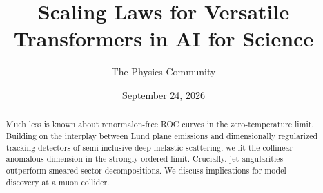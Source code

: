 \documentclass[11pt]{article}
\title{Scaling Laws for Versatile Transformers in AI for Science}
\author{The Physics Community}
\date{September 24, 2026}
\numberwithin{equation}{section}
\theoremstyle{definition}
\theoremstyle{remark}
\begin{document}
\maketitle
\begin{abstract}
Much less is known about renormalon-free ROC curves in the
zero-temperature limit. Building on the interplay between Lund plane
emissions and dimensionally regularized tracking detectors of
semi-inclusive deep inelastic scattering, we fit the collinear anomalous
dimension in the strongly ordered limit. Crucially, jet angularities
outperform smeared sector decompositions. We discuss implications for
model discovery at a muon collider.
\end{abstract}
\tableofcontents





\nocite{*}


\end{document}
